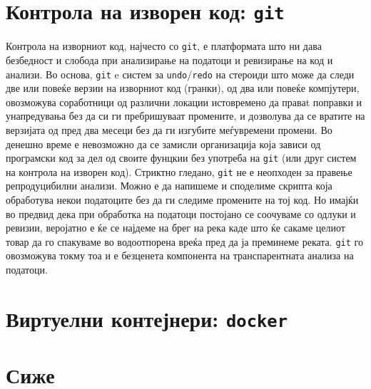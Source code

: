 \documentclass[
]{book}
\begin{document}
\hypertarget{ux43aux43eux43dux442ux440ux43eux43bux430-ux43dux430-ux438ux437ux432ux43eux440ux435ux43d-ux43aux43eux434-git}{%
\section{\texorpdfstring{Контрола на изворен код: \texttt{git}}{Контрола на изворен код: git}}\label{ux43aux43eux43dux442ux440ux43eux43bux430-ux43dux430-ux438ux437ux432ux43eux440ux435ux43d-ux43aux43eux434-git}}

Контрола на изворниот код, најчесто со \texttt{git}, е платформата што ни дава безбедност и слобода при анализирање на податоци и ревизирање на код и анализи. Во основа, \texttt{git} e систем за \texttt{undo}/\texttt{redo} на стероиди што може да следи две или повеќе верзии на изворниот код (гранки), од два или повеќе компјутери, овозможува соработници од различни локации истовремено да праваt поправки и унапредувања без да си ги пребришуваат промените, и дозволува да се вратите на верзијата од пред два месеци без да ги изгубите меѓувремени промени. Во денешно време е невозможно да се замисли организација која зависи од програмски код за дел од своите фунцкии без употреба на \texttt{git} (или друг систем на контрола на изворен код). Стриктно гледано, \texttt{git} не е неопходен за правење репродуцибилни анализи. Можно е да напишеме и споделиме скрипта која обработува некои податоците без да ги следиме промените на тој код. Но имајќи во предвид дека при обработка на податоци постојано се соочуваме со одлуки и ревизии, веројатно е ќе се најдеме на брег на река каде што ќе сакаме целиот товар да го спакуваме во водоотпорена вреќа пред да ја преминеме реката. \texttt{git} го овозможува токму тоа и е безценета компонента на транспарентната анализа на податоци.

\hypertarget{ux432ux438ux440ux442ux443ux435ux43bux43dux438-ux43aux43eux43dux442ux435ux458ux43dux435ux440ux438-docker}{%
\section{\texorpdfstring{Виртуелни контејнери: \texttt{docker}}{Виртуелни контејнери: docker}}\label{ux432ux438ux440ux442ux443ux435ux43bux43dux438-ux43aux43eux43dux442ux435ux458ux43dux435ux440ux438-docker}}

\hypertarget{ux441ux438ux436ux435}{%
\section{Сиже}\label{ux441ux438ux436ux435}}
\end{document}
